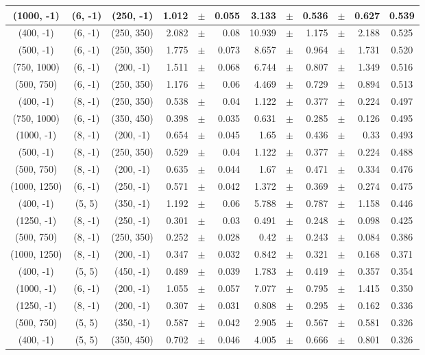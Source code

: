 \documentclass[12pt]{paper}
\begin{document}
\begin{table}[ht]
\begin{center}
{\begin{tabular}{|c|c|c|rrr|rrrrr|c|}
(1000, -1)&(6, -1)&(250, -1)&1.012&$\pm$&0.055&3.133&$\pm$&0.536&$\pm$&0.627&0.539\\\hline
(400, -1)&(6, -1)&(250, 350)&2.082&$\pm$&0.08&10.939&$\pm$&1.175&$\pm$&2.188&0.525\\\hline
(500, -1)&(6, -1)&(250, 350)&1.775&$\pm$&0.073&8.657&$\pm$&0.964&$\pm$&1.731&0.520\\\hline
(750, 1000)&(6, -1)&(200, -1)&1.511&$\pm$&0.068&6.744&$\pm$&0.807&$\pm$&1.349&0.516\\\hline
(500, 750)&(6, -1)&(250, 350)&1.176&$\pm$&0.06&4.469&$\pm$&0.729&$\pm$&0.894&0.513\\\hline
(400, -1)&(8, -1)&(250, 350)&0.538&$\pm$&0.04&1.122&$\pm$&0.377&$\pm$&0.224&0.497\\\hline
(750, 1000)&(6, -1)&(350, 450)&0.398&$\pm$&0.035&0.631&$\pm$&0.285&$\pm$&0.126&0.495\\\hline
(1000, -1)&(8, -1)&(200, -1)&0.654&$\pm$&0.045&1.65&$\pm$&0.436&$\pm$&0.33&0.493\\\hline
(500, -1)&(8, -1)&(250, 350)&0.529&$\pm$&0.04&1.122&$\pm$&0.377&$\pm$&0.224&0.488\\\hline
(500, 750)&(8, -1)&(200, -1)&0.635&$\pm$&0.044&1.67&$\pm$&0.471&$\pm$&0.334&0.476\\\hline
(1000, 1250)&(6, -1)&(250, -1)&0.571&$\pm$&0.042&1.372&$\pm$&0.369&$\pm$&0.274&0.475\\\hline
(400, -1)&(5, 5)&(350, -1)&1.192&$\pm$&0.06&5.788&$\pm$&0.787&$\pm$&1.158&0.446\\\hline
(1250, -1)&(8, -1)&(250, -1)&0.301&$\pm$&0.03&0.491&$\pm$&0.248&$\pm$&0.098&0.425\\\hline
(500, 750)&(8, -1)&(250, 350)&0.252&$\pm$&0.028&0.42&$\pm$&0.243&$\pm$&0.084&0.386\\\hline
(1000, 1250)&(8, -1)&(200, -1)&0.347&$\pm$&0.032&0.842&$\pm$&0.321&$\pm$&0.168&0.371\\\hline
(400, -1)&(5, 5)&(450, -1)&0.489&$\pm$&0.039&1.783&$\pm$&0.419&$\pm$&0.357&0.354\\\hline
(1000, -1)&(6, -1)&(200, -1)&1.055&$\pm$&0.057&7.077&$\pm$&0.795&$\pm$&1.415&0.350\\\hline
(1250, -1)&(8, -1)&(200, -1)&0.307&$\pm$&0.031&0.808&$\pm$&0.295&$\pm$&0.162&0.336\\\hline
(500, 750)&(5, 5)&(350, -1)&0.587&$\pm$&0.042&2.905&$\pm$&0.567&$\pm$&0.581&0.326\\\hline
(400, -1)&(5, 5)&(350, 450)&0.702&$\pm$&0.046&4.005&$\pm$&0.666&$\pm$&0.801&0.326\\\hline

\end{tabular}}
\end{center}
\end{table}
\end{document}
